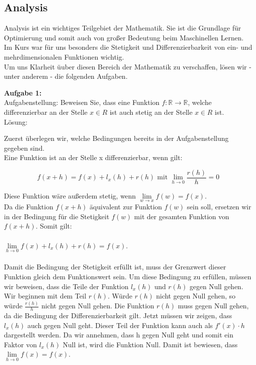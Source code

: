 \documentclass{article}
\begin{document}
\begin{multicols}{2}
\section{Analysis}


Analysis ist ein wichtiges Teilgebiet der Mathematik. Sie ist die Grundlage für Optimierung und somit auch von großer Bedeutung beim Maschinellen Lernen. \\
Im Kurs war für uns besonders die Stetigkeit und Differenzierbarkeit von ein- und mehrdimensionalen Funktionen wichtig. \\
Um uns Klarheit üuber diesen Bereich der Mathematik zu verschaffen, lösen wir - unter anderem - die folgenden Aufgaben.

\vspace{15pt}

\textbf{Aufgabe 1:} \\
Aufgabenstellung:
Beweisen Sie, dass eine Funktion $f:\mathds{R} \rightarrow \mathds{R}$, welche differenzierbar an der Stelle $x \in R$ ist auch stetig an der Stelle $x \in R$ ist.\\ %

Lösung:

Zuerst überlegen wir, welche Bedingungen bereits in der Aufgabenstellung gegeben sind. \\
Eine Funktion ist an der Stelle x differenzierbar, wenn gilt:

\begin{equation}f(x+h)=f(x)+l_x(h)+ r(h) \text{ mit } \lim\limits_{h \rightarrow 0} \frac{r(h)}{h}= 0 \end{equation} 

Diese Funktion wäre außerdem stetig, wenn $\lim\limits_{w \rightarrow x} f(w)=f(x)$.\\
Da die Funktion $f(x+h)$ äquivalent zur Funktion $f(w)$ sein soll, ersetzen wir in der Bedingung für die Stetigkeit $f(w)$ mit der gesamten Funktion von $f(x+h)$.  
Somit gilt: \\ \\
$\lim\limits_{h \rightarrow 0} f(x)+l_x(h)+r(h)=f(x)$. \\ \\

Damit die Bedingung der Stetigkeit erfüllt ist, muss der Grenzwert dieser Funktion gleich dem Funktionswert sein. Um diese Bedingung zu erfüllen, müssen wir beweisen, dass die Teile der Funktion $l_x(h)$ und $r(h)$ gegen Null gehen. Wir beginnen mit dem Teil $r(h)$.  Würde $r(h)$ nicht gegen Null gehen, so würde $\frac{r(h)}{h}$ nicht gegen Null gehen. Die Funktion $r(h)$ muss gegen Null gehen, da die Bedingung der Differenzierbarkeit gilt. Jetzt müssen wir zeigen, dass $l_x(h)$ auch gegen Null geht. Dieser Teil der Funktion kann auch als $f'(x) \cdot h$ dargestellt werden. Da wir annehmen, dass h gegen Null geht und somit ein Faktor von $l_x(h)$ Null ist, wird die Funktion Null. Damit ist bewiesen, dass $\lim\limits_{h \rightarrow 0} f(x)=f(x)$. \\


\end{multicols}
\end{document}
